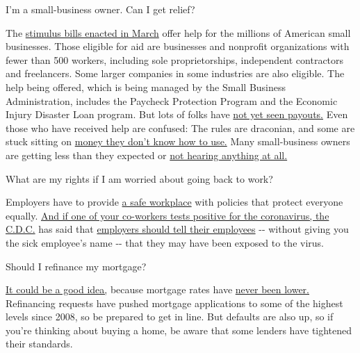  I'm a small-business owner. Can I get relief?

The
\href{https://www.nytimes3xbfgragh.onion/article/small-business-loans-stimulus-grants-freelancers-coronavirus.html}{stimulus
bills enacted in March} offer help for the millions of American small
businesses. Those eligible for aid are businesses and nonprofit
organizations with fewer than 500 workers, including sole
proprietorships, independent contractors and freelancers. Some larger
companies in some industries are also eligible. The help being offered,
which is being managed by the Small Business Administration, includes
the Paycheck Protection Program and the Economic Injury Disaster Loan
program. But lots of folks have
\href{https://www.nytimes3xbfgragh.onion/interactive/2020/05/07/business/small-business-loans-coronavirus.html}{not
yet seen payouts.} Even those who have received help are confused: The
rules are draconian, and some are stuck sitting on
\href{https://www.nytimes3xbfgragh.onion/2020/05/02/business/economy/loans-coronavirus-small-business.html}{money
they don't know how to use.} Many small-business owners are getting less
than they expected or
\href{https://www.nytimes3xbfgragh.onion/2020/06/10/business/Small-business-loans-ppp.html}{not
hearing anything at all.}

 What are my rights if I am worried about going back to work?

Employers have to provide
\href{https://www.osha.gov/SLTC/covid-19/standards.html}{a safe
workplace} with policies that protect everyone equally.
\href{https://www.nytimes3xbfgragh.onion/article/coronavirus-money-unemployment.html}{And
if one of your co-workers tests positive for the coronavirus, the
C.D.C.} has said that
\href{https://www.cdc.gov/coronavirus/2019-ncov/community/guidance-business-response.html}{employers
should tell their employees} -\/- without giving you the sick employee's
name -\/- that they may have been exposed to the virus.

 Should I refinance my mortgage?

\href{https://www.nytimes3xbfgragh.onion/article/coronavirus-money-unemployment.html}{It
could be a good idea,} because mortgage rates have
\href{https://www.nytimes3xbfgragh.onion/2020/07/16/business/mortgage-rates-below-3-percent.html}{never
been lower.} Refinancing requests have pushed mortgage applications to
some of the highest levels since 2008, so be prepared to get in line.
But defaults are also up, so if you're thinking about buying a home, be
aware that some lenders have tightened their standards.

